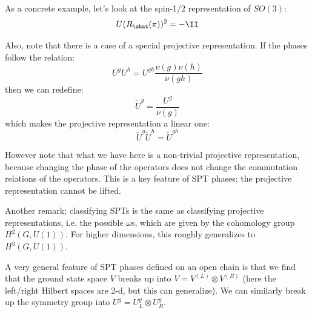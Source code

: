 As a concrete example, let's look at the spin-1/2 representation of $SO(3)$:
\begin{equation}
    U(R_{\zhat}(\pi))^2 = -\II
\end{equation}

Also, note that there is a case of a special projective representation. If the phases follow the relation:
\begin{equation}
    U^g U^h = U^{gh}\frac{\nu(g)\nu(h)}{\nu(gh)}
\end{equation}
then we can redefine:
\begin{equation}
    \tilde{U}^g = \frac{U^g}{\nu(g)}
\end{equation}
which makes the projective representation a linear one:
\begin{equation}
    \tilde{U}^g\tilde{U}^h = \tilde{U}^{gh}
\end{equation}

However note that what we have here is a non-trivial projective representation, because changing the phase of the operators does not change the commutation relations of the operators. This is a key feature of SPT phases; the projective representation cannot be lifted.

Another remark; classifying SPTs is the same as classifying projective representations, i.e. the possible $\omega$s, which are given by the cohomology group $H^2(G, U(1))$. For higher dimensions, this roughly generalizes to $H^3(G, U(1))$.

A very general feature of SPT phases defined on an open chain is that we find that the ground state space $V$ breaks up into $V = V^{(L)} \otimes V^{(R)}$ (here the left/right Hilbert spaces are 2-d, but this can generalize). We can similarly break up the symmetry group into $U^g = U^g_L \otimes U^g_R$.